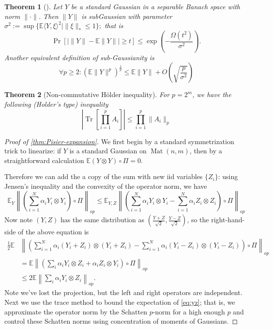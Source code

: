 \documentclass[aos]{imsart}
\newtheorem{theorem}{Theorem}[section]
\theoremstyle{definition}
\numberwithin{equation}{section}
\DeclareMathOperator{\mat}{Mat}
\DeclareMathOperator{\tr}{Tr}
\newcommand{\ot}{\otimes}
\newcommand{\E}{\mathbb{E}}
\newcommand{\CF}[1]{{\color{purple}[CF: #1]}}
\begin{document}
\begin{appendix}
\begin{theorem}[\cite{P86}]
Let $Y$ be a standard Gaussian in a separable Banach space with norm $\|\cdot\|$. Then $\|Y\|$ is subGaussian with parameter $\sigma^{2} := \sup \{ \E \langle Y, \xi \rangle^{2} \mid \|\xi\|_{*} \leq 1 \}; $ that is
\[ \Pr [ | \|Y\| - \E \|Y\| | \geq t ] \leq \exp \left( - \frac{\Omega(t^{2})}{\sigma^{2}} \right).   \]
Another equivalent definition of sub-Gaussianity is
\[ \forall p \geq 2: (\E \|Y\|^{p})^{\frac{1}{p}} \leq \E \|Y\| + O \left( \sqrt{\frac{p}{\sigma^{2}}} \right)   \]
\end{theorem}

\begin{theorem}[Non-commutative H\"older inequality]\label{thm:holder}
For $p = 2^{m}$, we have the following (Holder's type) inequality
\[ |\tr[\prod_{i=1}^{p} A_{i}]| \leq \prod_{i=1}^{p} \|A_{i}\|_{p}   \]
\end{theorem}



\begin{proof} [Proof of \cref{thm:Pisier-expansion}]
We first begin by a standard symmetrization trick to linearize: if $Y$ is a standard Gaussian on $\mat(n,m)$, then by a straightforward calculation $\E (Y \otimes Y)\circ \Pi = 0$.

Therefore we can add the a copy of the sum with new iid variables $\{Z_{i}\}$: using Jensen's inequality and the convexity of the operator norm, we have
\[ \E_{Y} \left\|\left(\sum_{i=1}^{N} \alpha_{i} Y_{i} \otimes Y_{i}\right) \circ \Pi\right\|_{op} \leq
\E_{Y,Z} \left\|\left(\sum_{i=1}^{N} \alpha_{i} Y_{i} \otimes Y_{i}-\sum_{i=1}^{N} \alpha_{i} Z_{i} \otimes Z_{i}\right) \circ \Pi \right\|_{op}  \] Now note $(Y,Z)$ has the same distribution as $(\frac{Y+Z}{\sqrt{2}},\frac{Y-Z}{\sqrt{2}})$, so the right-hand-side of the above equation is
\begin{align}\frac{1}{2}\E &\left\|\left(\sum_{i=1}^{N} \alpha_{i} (Y_{i}+Z_{i}) \otimes (Y_{i}+Z_{i})  - \sum_{i=1}^{N} \alpha_{i} (Y_{i}-Z_{i}) \otimes (Y_{i}-Z_{i})\right)\circ \Pi \right\|_{op}\nonumber \\
& = \E \left\|\left(\sum_{i} \alpha_{i} Y_{i} \otimes Z_{i}  + \alpha_{i} Z_{i} \otimes Y_{i} \right) \circ \Pi \right\|_{op}  \nonumber\\
& \leq 2 \E \left\|\sum_{i} \alpha_{i} Y_{i} \otimes Z_{i}\right\|_{op}.   \label{eq:yz}
\end{align}
Note we've lost the projection, but the left and right operators are independent. Next we use the trace method to bound the expectation of \cref{eq:yz}; that is, we approximate the operator norm by the Schatten $p$-norm for a high enough $p$ and control these Schatten norms using concentration of moments of Gaussians.


\end{proof}
\end{appendix}
\end{document}
